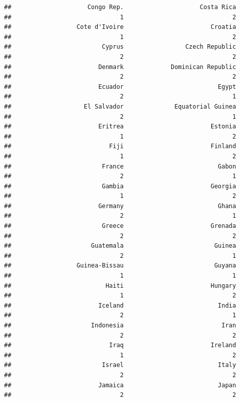\documentclass[
]{article}
\begin{document}
\begin{verbatim}
##                     Congo Rep.                     Costa Rica 
##                              1                              2 
##                  Cote d'Ivoire                        Croatia 
##                              1                              2 
##                         Cyprus                 Czech Republic 
##                              2                              2 
##                        Denmark             Dominican Republic 
##                              2                              2 
##                        Ecuador                          Egypt 
##                              2                              1 
##                    El Salvador              Equatorial Guinea 
##                              2                              1 
##                        Eritrea                        Estonia 
##                              1                              2 
##                           Fiji                        Finland 
##                              1                              2 
##                         France                          Gabon 
##                              2                              1 
##                         Gambia                        Georgia 
##                              1                              2 
##                        Germany                          Ghana 
##                              2                              1 
##                         Greece                        Grenada 
##                              2                              2 
##                      Guatemala                         Guinea 
##                              2                              1 
##                  Guinea-Bissau                         Guyana 
##                              1                              1 
##                          Haiti                        Hungary 
##                              1                              2 
##                        Iceland                          India 
##                              2                              1 
##                      Indonesia                           Iran 
##                              2                              2 
##                           Iraq                        Ireland 
##                              1                              2 
##                         Israel                          Italy 
##                              2                              2 
##                        Jamaica                          Japan 
##                              2                              2 

\end{verbatim}
\end{document}
